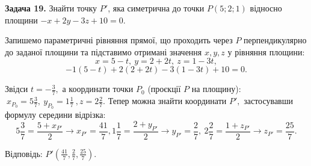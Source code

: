 \documentclass[14pt,draft]{extreport}
\begin{document}
\bigskip \textbf{Задача 19.} Знайти точку $P'$, яка симетрична
до точки $P(5;2;1)$ відносно площини $-x+2y-3z+10=0$. \bigskip

%

Запишемо параметричні рівняння прямої, що проходить через $P$
перпендикулярно до заданої площини та підставимо отримані
значення $x, y, z$ у рівняння площини:
\begin{equation}
	x=5-t,~y=2+2t,~z=1-3t,
\end{equation}
\begin{equation}
	-1(5-t)+2(2+2t)-3(1-3t)+10=0.
\end{equation}

Звідси $t=-\frac{3}{7},$ а координати точки $P_0$
(проєкції $P$ на площину): $~x_{P_0}=5\frac{3}{7},
~y_{P_0}=1\frac{1}{7}~,z=2\frac{2}{7}.$ Тепер можна
знайти координати $P',$ застосувавши формулу
середини відрізка:
\begin{equation}
	5\frac{3}{7}=\frac{5+x_{P'}}{2}\rightarrow
	x_{P'}=\frac{41}{7},
	1\frac{1}{7}=\frac{2+y_{P'}}{2}\rightarrow
	y_{P'}=\frac{2}{7},~
	2\frac{2}{7}=\frac{1+z_{P'}}{2}\rightarrow
	z_{P'}=\frac{25}{7}.
\end{equation}


\null\hfill
\begin{boxedminipage}{0.73\textwidth}
	Відповідь: $P'(\frac{41}{7}, \frac{2}{7}, \frac{25}{7}).$
\end{boxedminipage}
\end{document}
